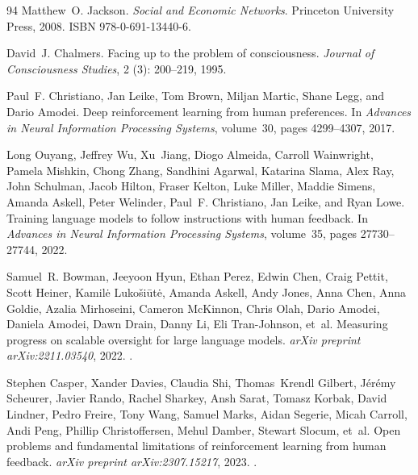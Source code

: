 \documentclass[11pt]{article}
\theoremstyle{plain}
\theoremstyle{definition}
\theoremstyle{remark}
\begin{document}
\begin{thebibliography}{94}
Matthew~O. Jackson.
\newblock \emph{Social and Economic Networks}.
\newblock Princeton University Press, 2008.
\newblock ISBN 978-0-691-13440-6.

David~J. Chalmers.
\newblock Facing up to the problem of consciousness.
\newblock \emph{Journal of Consciousness Studies}, 2 (3):
  200--219, 1995.

Paul~F. Christiano, Jan Leike, Tom Brown, Miljan Martic, Shane Legg, and Dario
  Amodei.
\newblock Deep reinforcement learning from human preferences.
\newblock In \emph{Advances in Neural Information Processing Systems},
  volume~30, pages 4299--4307, 2017.

Long Ouyang, Jeffrey Wu, Xu~Jiang, Diogo Almeida, Carroll Wainwright, Pamela
  Mishkin, Chong Zhang, Sandhini Agarwal, Katarina Slama, Alex Ray, John
  Schulman, Jacob Hilton, Fraser Kelton, Luke Miller, Maddie Simens, Amanda
  Askell, Peter Welinder, Paul~F. Christiano, Jan Leike, and Ryan Lowe.
\newblock Training language models to follow instructions with human feedback.
\newblock In \emph{Advances in Neural Information Processing Systems},
  volume~35, pages 27730--27744, 2022.

Samuel~R. Bowman, Jeeyoon Hyun, Ethan Perez, Edwin Chen, Craig Pettit, Scott
  Heiner, Kamil{\.e} Luko{\v{s}}i{\=u}t{\.e}, Amanda Askell, Andy Jones, Anna
  Chen, Anna Goldie, Azalia Mirhoseini, Cameron McKinnon, Chris Olah, Dario
  Amodei, Daniela Amodei, Dawn Drain, Danny Li, Eli Tran-Johnson, et~al.
\newblock Measuring progress on scalable oversight for large language models.
\newblock \emph{arXiv preprint arXiv:2211.03540}, 2022.
\newblock {}.

Stephen Casper, Xander Davies, Claudia Shi, Thomas~Krendl Gilbert,
  J{\'e}r{\'e}my Scheurer, Javier Rando, Rachel Sharkey, Ansh Sarat, Tomasz
  Korbak, David Lindner, Pedro Freire, Tony Wang, Samuel Marks, Aidan Segerie,
  Micah Carroll, Andi Peng, Phillip Christoffersen, Mehul Damber, Stewart
  Slocum, et~al.
\newblock Open problems and fundamental limitations of reinforcement learning
  from human feedback.
\newblock \emph{arXiv preprint arXiv:2307.15217}, 2023.
\newblock {}.


\end{thebibliography}
\end{document}
